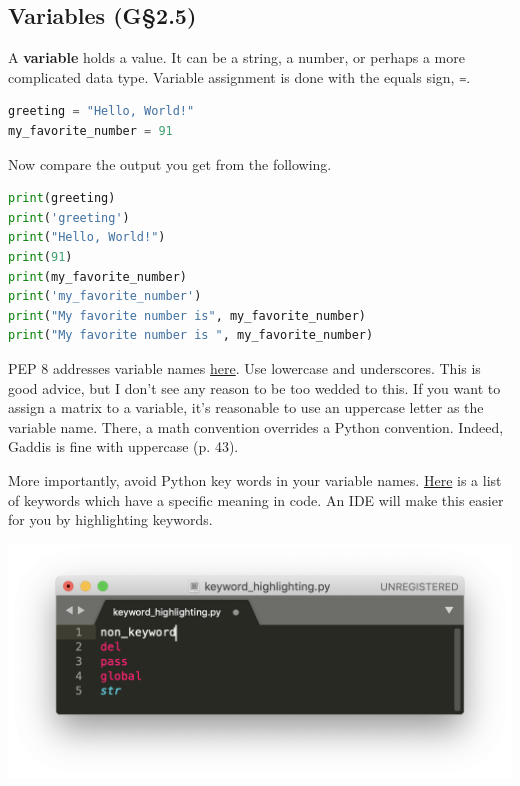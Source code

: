 \subsection{Variables (G\S 2.5)}

A \textbf{variable} holds a value. It can be a string, a number, or perhaps a more complicated data type.
Variable assignment is done with the equals sign, \lstinline[language = Python]{=}.


\smallskip

\begin{lstlisting}[language = Python]
greeting = "Hello, World!"
my_favorite_number = 91 \end{lstlisting}

\smallskip

 Now compare the output you get from the following.

\begin{lstlisting}[language = Python]
print(greeting)
print('greeting')
print("Hello, World!")
print(91)
print(my_favorite_number)
print('my_favorite_number')
print("My favorite number is", my_favorite_number)
print("My favorite number is ", my_favorite_number) \end{lstlisting}


\smallskip

 PEP 8 addresses variable names \textcolor{blue}{\href{https://www.python.org/dev/peps/pep-0008/\#function-and-variable-names}{here}}.
Use lowercase and underscores.
This is good advice, but I don't see any reason to be too wedded to this. If you want to assign a matrix to a variable, 
it's reasonable to use an uppercase letter as the variable name. There, a math convention overrides a Python convention. Indeed, Gaddis is fine with uppercase (p. 43).

\smallskip

 More importantly, avoid Python key words in your variable names. \textcolor{blue}{\href{https://www.w3schools.com/python/python_ref_keywords.asp}
{Here}} is a list of keywords which have a specific meaning in code. An IDE will make this easier for you by highlighting keywords.

\begin{center}
\includegraphics[width = .53\textwidth]{sublime_keyword_highlight.png}
\end{center}

